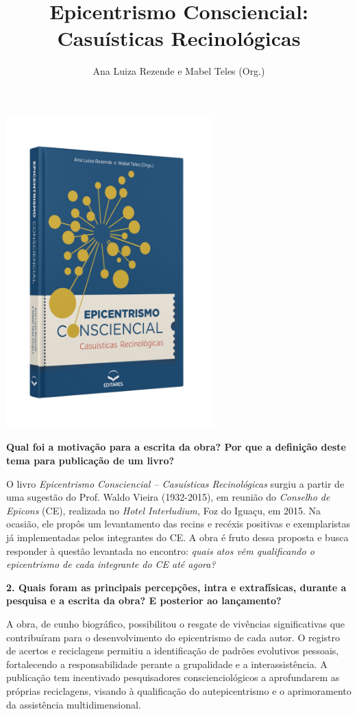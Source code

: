 \documentclass{gescons}
\author{Ana Luiza Rezende e Mabel Teles (Org.)}
\title{Epicentrismo Consciencial: Casuísticas Recinológicas}
\begin{document}
    \makeentrevistatitle

    \begin{multicols}{2}


\begin{center}
    \includegraphics[width=8cm]{articles/entrevista/mockups/Mabel-e-Ana-Luiza.png}
\end{center}

\textbf{Qual foi a motivação para a escrita da obra? Por que a definição deste tema para publicação de um livro?}


O livro \textit{Epicentrismo Consciencial – Casuísticas Recinológicas} surgiu a partir de uma sugestão do Prof. Waldo Vieira (1932-2015), em reunião do \textit{Conselho de Epicons} (CE), realizada no \textit{Hotel Interludium,} Foz do Iguaçu, em 2015. Na ocasião, ele propôs um levantamento das recins e recéxis positivas e exemplaristas já implementadas pelos integrantes do CE. A obra é fruto dessa proposta e busca responder à questão levantada no encontro: \textit{quais atos vêm qualificando o epicentrismo de cada integrante do CE até agora? }

\textbf{2. Quais foram as principais percepções, intra e extrafísicas, durante a pesquisa e a escrita da obra? E posterior ao lançamento?}

A obra, de cunho biográfico, possibilitou o resgate de vivências significativas que contribuíram para o desenvolvimento do epicentrismo de cada autor. O registro de acertos e reciclagens permitiu a identificação de padrões evolutivos pessoais, fortalecendo a responsabilidade perante a grupalidade e a interassistência. A publicação tem incentivado pesquisadores conscienciológicos a aprofundarem as próprias reciclagens, visando à qualificação do autepicentrismo e o aprimoramento da assistência multidimensional.  


\end{multicols}
\end{document}

